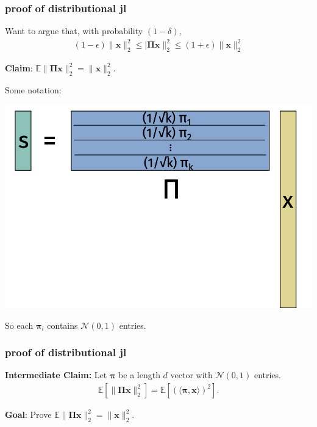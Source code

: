 \documentclass[compress]{beamer}
\newcommand{\bs}[1]{\boldsymbol{#1}}
\newcommand{\bv}[1]{\mathbf{#1}}
\newcommand{\E}{\mathbb{E}}
\begin{document}
\begin{frame}
	\frametitle{proof of distributional jl}
	Want to argue that, with probability $(1-\delta)$,
	\begin{align*}
		(1-\epsilon)\|\bv{x}\|_2^2 \leq |\bs{\Pi}\bv{x}\|_2^2 \leq (1+\epsilon)\|\bv{x}\|_2^2 
	\end{align*}
	
	\begin{center}
		\alert{\textbf{Claim}: $\E \|\bs{\Pi} \bv{x} \|_2^2 = \|\bv{x}\|_2^2.$}
	\end{center}
	
	\vspace{-1em}
	Some notation:
	\begin{center}
		\includegraphics[width=.6\textwidth]{jl_notation.png}
		
		So each $\bs{\pi}_i$ contains $\mathcal{N}(0,1)$ entries. 
	\end{center}
\end{frame}

\begin{frame}
	\frametitle{proof of distributional jl}
	\textbf{Intermediate Claim:} Let $\bs{\pi}$ be a length $d$ vector with $\mathcal{N}(0,1)$ entries. 
	\begin{align*}
		\E\left[\|\bs{\Pi} \bv{x} \|_2^2 \right]  = \E\left[\left(\langle\bs{\pi},\bv{x}\rangle\right)^2 \right] .
	\end{align*}
	\vspace{9em}
	\begin{block}{\vspace*{-3ex}}
		\small \textbf{Goal}: Prove $\E \|\bs{\Pi} \bv{x} \|_2^2 = \|\bv{x}\|_2^2$.
	\end{block}
\end{frame}
\end{document}
